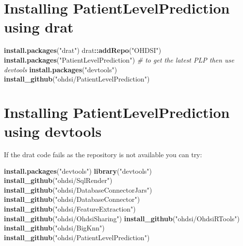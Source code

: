 \documentclass[]{article}
\newenvironment{Shaded}{\begin{snugshade}}{\end{snugshade}}
\newcommand{\KeywordTok}[1]{\textcolor[rgb]{0.13,0.29,0.53}{\textbf{#1}}}
\newcommand{\StringTok}[1]{\textcolor[rgb]{0.31,0.60,0.02}{#1}}
\newcommand{\CommentTok}[1]{\textcolor[rgb]{0.56,0.35,0.01}{\textit{#1}}}
\newcommand{\OperatorTok}[1]{\textcolor[rgb]{0.81,0.36,0.00}{\textbf{#1}}}
\newcommand{\NormalTok}[1]{#1}
\begin{document}
\section{Installing PatientLevelPrediction using
drat}\label{installing-patientlevelprediction-using-drat}

\begin{Shaded}
\begin{Highlighting}[]
\KeywordTok{install.packages}\NormalTok{(}\StringTok{"drat"}\NormalTok{)}
\NormalTok{drat}\OperatorTok{::}\KeywordTok{addRepo}\NormalTok{(}\StringTok{"OHDSI"}\NormalTok{)}
\KeywordTok{install.packages}\NormalTok{(}\StringTok{"PatientLevelPrediction"}\NormalTok{)}
\CommentTok{# to get the latest PLP then use devtools}
\KeywordTok{install.packages}\NormalTok{(}\StringTok{"devtools"}\NormalTok{)}
\KeywordTok{install_github}\NormalTok{(}\StringTok{"ohdsi/PatientLevelPrediction"}\NormalTok{)}
\end{Highlighting}
\end{Shaded}

\section{Installing PatientLevelPrediction using
devtools}\label{installing-patientlevelprediction-using-devtools}

If the drat code fails as the repository is not available you can try:

\begin{Shaded}
\begin{Highlighting}[]
\KeywordTok{install.packages}\NormalTok{(}\StringTok{"devtools"}\NormalTok{)}
\KeywordTok{library}\NormalTok{(}\StringTok{"devtools"}\NormalTok{)}
\KeywordTok{install_github}\NormalTok{(}\StringTok{"ohdsi/SqlRender"}\NormalTok{)}
\KeywordTok{install_github}\NormalTok{(}\StringTok{"ohdsi/DatabaseConnectorJars"}\NormalTok{)}
\KeywordTok{install_github}\NormalTok{(}\StringTok{"ohdsi/DatabaseConnector"}\NormalTok{)}
\KeywordTok{install_github}\NormalTok{(}\StringTok{"ohdsi/FeatureExtraction"}\NormalTok{)}
\KeywordTok{install_github}\NormalTok{(}\StringTok{"ohdsi/OhdsiSharing"}\NormalTok{)}
\KeywordTok{install_github}\NormalTok{(}\StringTok{"ohdsi/OhdsiRTools"}\NormalTok{)}
\KeywordTok{install_github}\NormalTok{(}\StringTok{"ohdsi/BigKnn"}\NormalTok{)}
\KeywordTok{install_github}\NormalTok{(}\StringTok{"ohdsi/PatientLevelPrediction"}\NormalTok{)}
\end{Highlighting}
\end{Shaded}
\end{document}
